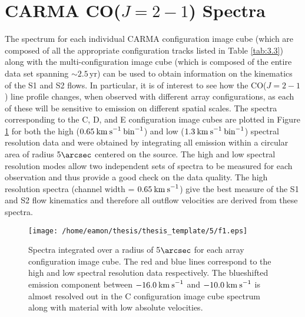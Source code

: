 \section{CARMA CO($J=2-1$) Spectra}
\label{sec:5.3}

The spectrum for each individual CARMA configuration image cube (which are composed of all the appropriate configuration tracks listed in Table \ref{tab:3.3}) along with the multi-configuration image cube (which is composed of the entire data set  spanning $\sim 2.5$\,yr) can be used to obtain information on the kinematics of the S1 and S2 flows. In particular, it is of interest to see how the CO($J=2-1$) line profile changes, when observed  with different array configurations, as each of these will be sensitive to emission on different spatial scales. The spectra corresponding  to the C, D, and E configuration image cubes are plotted in Figure \ref{fig:5.4} for both the high ($0.65\>{\rm km\>s}^{-1}\> \rm{bin}^{-1}$) and low ($1.3\>{\rm km\>s}^{-1}\> \rm{bin}^{-1}$) spectral resolution data and were obtained by integrating all emission within a circular area of radius 5$\arcsec$ centered on the source. The high and low spectral resolution modes allow two independent sets of spectra to be measured for each observation and thus provide a good check on the data quality. The high resolution  spectra (channel width = $0.65\>{\rm km\>s}^{-1}$) give the best measure of the S1 and S2 flow kinematics and therefore all outflow velocities are derived from these spectra.

\begin{figure}[!ht]
\centering 
\texttt{[image: /home/eamon/thesis/thesis\_template/5/f1.eps]}
\caption[Spectra for each CARMA configuration]{Spectra integrated over a radius of 5$\arcsec$ for each array configuration image cube. The red and blue lines correspond to the high and low spectral resolution data respectively. The blueshifted emission component between $-16.0\>{\rm km\>s}^{-1}$ and $-10.0\>{\rm km\>s}^{-1}$ is almost resolved out in the C configuration image cube spectrum along with material with low absolute velocities. }
\label{fig:5.4}
\end{figure}

